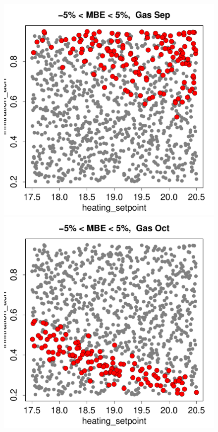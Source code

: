 \documentclass[a4paper, 12pt]{article}
\begin{document}
\begin{figure}
 \includegraphics[width=\scale]{MBE/SelectedMBE_Gas_09.pdf}\\
 \includegraphics[width=\scale]{MBE/SelectedMBE_Gas_10.pdf}

\end{figure}
\end{document}
